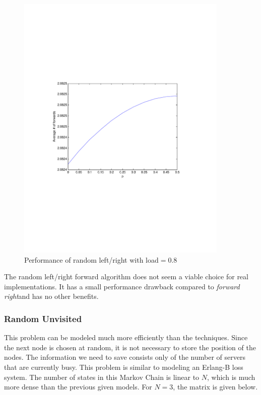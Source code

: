 \documentclass[10pt,a4paper]{article}
\newcommand{\FR}{\textit{forward right\xspace}}
\begin{document}
\begin{figure}[h!tb]
\centering
\includegraphics[clip=true, trim=9em 24em 9em 24em, width=0.9\textwidth]{resources/plotrandlrp.pdf}
\caption{Performance of random left/right with load$=0.8$}
\label{validrlrp}
\end{figure}

The random left/right forward algorithm does not seem a viable choice for real implementations. It has a small performance drawback compared to \FR and has no other benefits.

\subsubsection*{Random Unvisited}
This problem can be modeled much more efficiently than the techniques. Since the next node is chosen at random, it is not necessary to store the position of the nodes. The information we need to save consists only of the number of servers that are currently busy. This problem is similar to modeling an Erlang-B loss system. The number of states in this Markov Chain is linear to $N$, which is much more dense than the previous given models. For $N=3$, the matrix is given below.
\end{document}
